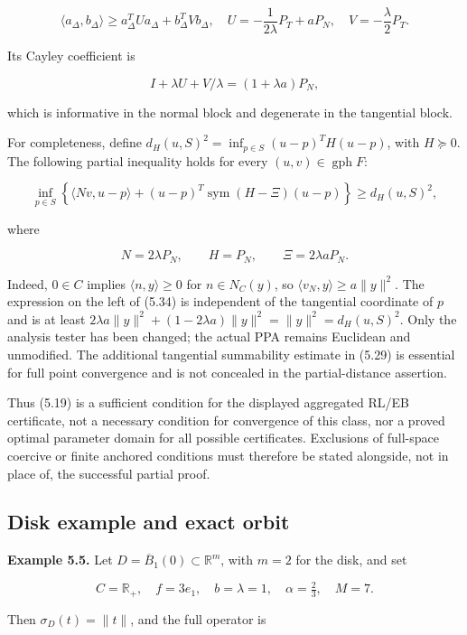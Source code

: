 \documentclass[11pt,a4paper]{article}
\theoremstyle{plain}
\theoremstyle{definition}
\theoremstyle{remark}
\begin{document}
\[
\langle a_\Delta,b_\Delta\rangle
\ge a_\Delta^TU a_\Delta+b_\Delta^TV b_\Delta,
\quad
U=-\frac1{2\lambda}P_T+aP_N,
\quad V=-\frac\lambda2P_T.
\tag{5.32}
\]

Its Cayley coefficient is

\[
I+\lambda U+V/\lambda=(1+\lambda a)P_N,
\tag{5.33}
\]

which is informative in the normal block and degenerate in the
tangential block.

For completeness, define \(d_H(u,S)^2=\inf_{p\in S}(u-p)^TH(u-p)\), with
\(H\succeq0\). The following partial inequality holds for every
\((u,v)\in\operatorname{gph}F\):

\[
\inf_{p\in S}\left\{
\langle Nv,u-p\rangle+
(u-p)^T\operatorname{sym}(H-\Xi)(u-p)
\right\}\ge d_H(u,S)^2,
\tag{5.34}
\]

where

\[
N=2\lambda P_N,\qquad H=P_N,\qquad\Xi=2\lambda aP_N.
\tag{5.35}
\]

Indeed, \(0\in C\) implies \(\langle n,y\rangle\ge0\) for
\(n\in N_C(y)\), so \(\langle v_N,y\rangle\ge a\|y\|^2\). The expression
on the left of (5.34) is independent of the tangential coordinate of
\(p\) and is at least
\(2\lambda a\|y\|^2+(1-2\lambda a)\|y\|^2=\|y\|^2=d_H(u,S)^2\). Only the
analysis tester has been changed; the actual PPA remains Euclidean and
unmodified. The additional tangential summability estimate in (5.29) is
essential for full point convergence and is not concealed in the
partial-distance assertion.

Thus (5.19) is a sufficient condition for the displayed aggregated RL/EB
certificate, not a necessary condition for convergence of this class,
nor a proved optimal parameter domain for all possible certificates.
Exclusions of full-space coercive or finite anchored conditions must
therefore be stated alongside, not in place of, the successful partial
proof.

\hypertarget{disk-example-and-exact-orbit}{%
\subsection{Disk example and exact
orbit}\label{disk-example-and-exact-orbit}}

\textbf{Example 5.5.} Let \(D=\overline B_1(0)\subset\mathbb R^m\), with
\(m=2\) for the disk, and set

\[
C=\mathbb R_+,\quad f=3e_1,\quad b=\lambda=1,
\quad\alpha=\tfrac23,\quad M=7.
\tag{5.36}
\]

Then \(\sigma_D(t)=\|t\|\), and the full operator is
\end{document}
